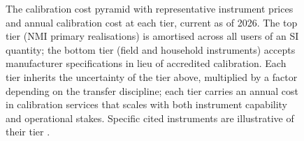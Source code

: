 \begin{figure}[htbp]
\begin{tikzpicture}[
  level/.style={draw=engblack, minimum height=1.1cm, align=center,
    font=\small},
]
\end{tikzpicture}
\caption[Calibration cost pyramid]{The calibration cost pyramid with
representative instrument prices and annual calibration cost at each
tier, current as of 2026. The top tier (NMI primary realisations) is
amortised across all users of an SI quantity; the bottom tier (field
and household instruments) accepts manufacturer specifications in
lieu of accredited calibration. Each tier inherits the uncertainty
of the tier above, multiplied by a factor depending on the transfer
discipline; each tier carries an annual cost in calibration services
that scales with both instrument capability and operational stakes.
Specific cited instruments are illustrative of their tier
\cite{web:ch03t3-keysight-34470a, web:ch03t3-fluke-5520a,
web:ch03t3-fluke-1551a-stik, web:ch03t3-microsemi-5071a,
web:ch03t3-microsemi-mhm-2010}.}
\label{fig:vol01:ch03:cost-pyramid}
\end{figure}
